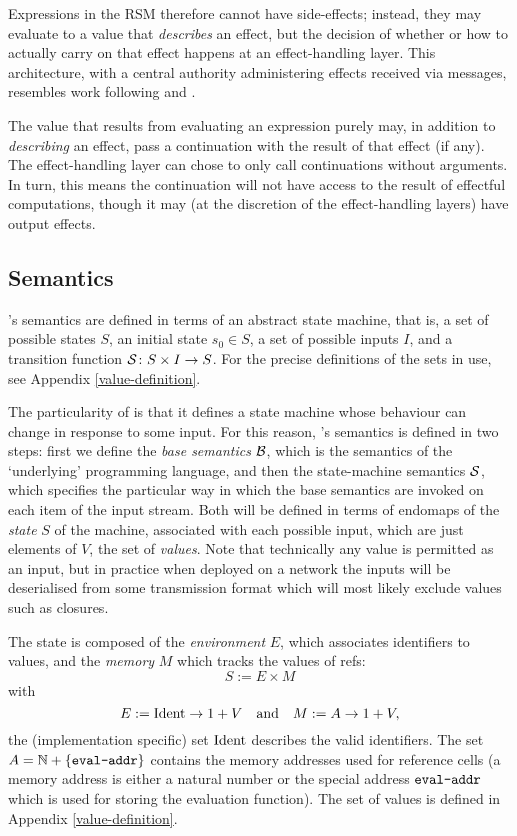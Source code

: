Expressions in the RSM therefore cannot have
side-effects; instead, they may evaluate to a value that \emph{describes} an effect,
but the decision of whether or how to actually carry on that effect happens at an
effect-handling layer. This architecture, with a central authority
administering effects received via messages, resembles work following
\cite{Cartwright1994} and \cite{Bauer2013}.

The value that results from evaluating an expression purely may, in addition to
\emph{describing} an effect, pass a continuation with the result of that
effect (if any). The effect-handling layer can chose to only call continuations
without arguments. In turn, this means the continuation will not have access to
the result of effectful computations, though it may (at the discretion of the
effect-handling layers) have output effects.

\subsection{Semantics}

\rad{}'s semantics are defined in terms of an abstract state machine, that is, a
set of possible states $S$, an initial state $s_0 \in S$, a set of possible
inputs $I$, and a transition function $\S \colon S \times I \to S$.
For the precise definitions of the sets in use, see Appendix
\ref{value-definition}.

The particularity of \rad{} is that it defines a state machine whose behaviour
can change in response to some input. For this reason, \rad{}'s semantics is
defined in two steps: first we define the \emph{base semantics} $\B$, which is
the semantics of the `underlying' programming language, and then the
state-machine semantics $\S$, which specifies the particular way in which the
base semantics are invoked on each item of the input stream. Both will be
defined in terms of endomaps of the \emph{state} $S$ of the machine, associated
with each possible input, which are just elements of $V$, the set of
\emph{values}. Note that technically any value is permitted as an input, but in
practice when deployed on a network the inputs will be deserialised from some
transmission format which will most likely exclude values such as closures.

The state is composed of the \emph{environment} $E$, which associates identifiers to
values, and the \emph{memory} $M$ which tracks the values of refs:
\[
S := E \times M
\]
with
\[
E := \Ident \to 1 + V \quad \text{and} \quad M := A \to 1 + V,
\]
the (implementation specific) set $\Ident$ describes the valid identifiers. The
set $A = \mathbb{N} + \{\evalAddr\}$ contains the memory addresses used for
reference cells (a memory address is either a natural number or the
special address $\evalAddr$ which is used for storing the evaluation function).
The set of values is defined in Appendix \ref{value-definition}.

